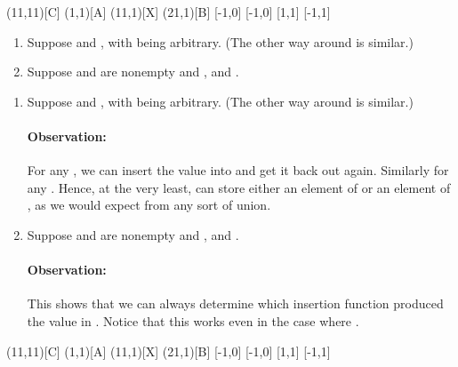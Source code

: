 \documentclass{seminar}
\begin{document}
\begin{slide}
\newslide

\begin{cdiag}
\obj(11,11)[C]{}
\obj(1,1)[A]{}
\obj(11,1)[X]{}
\obj(21,1)[B]{}
[-1,0]
[-1,0]
[1,1]
[-1,1]
\end{cdiag}

\begin{enumerate}
\item Suppose  and , with  being arbitrary.
(The other way around is similar.)
\item Suppose  and  are nonempty and ,
 and .
\end{enumerate}

\newslide

\begin{enumerate}
\item Suppose  and , with  being arbitrary.
(The other way around is similar.)

\paragraph{Observation:}  For any , we can insert the value
into  and get it back out again.  Similarly for any .
Hence, at the very least,  can store either an element of 
or an element of , as we would expect from any sort of union.

\item Suppose  and  are nonempty and ,
 and .

\paragraph{Observation:}
This shows that we can always determine which insertion function
produced the value in .  Notice that this works even in
the case where .
\end{enumerate}

\newslide

\begin{cdiag}
\obj(11,11)[C]{}
\obj(1,1)[A]{}
\obj(11,1)[X]{}
\obj(21,1)[B]{}
[-1,0]
[-1,0]
[1,1]
[-1,1]
\end{cdiag}


\end{slide}
\end{document}
